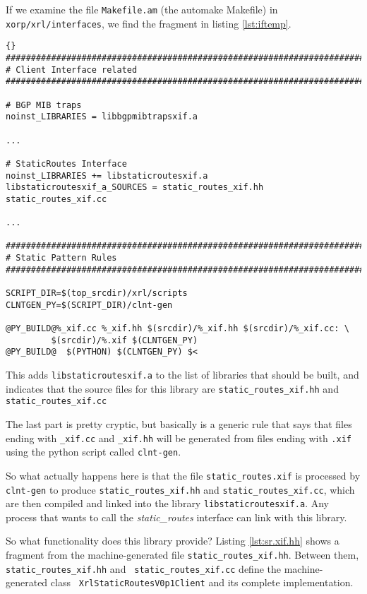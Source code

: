 \documentclass[11pt]{article}
\newcommand{\stt}{\tt\small}
\newcommand{\SRI}{{\it static\_routes}\xspace}
\begin{document}
If we examine the file {\stt Makefile.am} (the automake Makefile) in
{\stt xorp/xrl/interfaces}, we find the fragment in listing
\ref{lst:iftemp}.
\begin{lstlisting}[caption={ Fragment from xorp/xrl/interfaces/Makefile.am %
                                     \label{lst:iftemp} } ]{}
###############################################################################
# Client Interface related
###############################################################################

# BGP MIB traps
noinst_LIBRARIES = libbgpmibtrapsxif.a

...

# StaticRoutes Interface
noinst_LIBRARIES += libstaticroutesxif.a
libstaticroutesxif_a_SOURCES = static_routes_xif.hh static_routes_xif.cc

...

###############################################################################
# Static Pattern Rules
###############################################################################

SCRIPT_DIR=$(top_srcdir)/xrl/scripts
CLNTGEN_PY=$(SCRIPT_DIR)/clnt-gen

@PY_BUILD@%_xif.cc %_xif.hh $(srcdir)/%_xif.hh $(srcdir)/%_xif.cc: \
         $(srcdir)/%.xif $(CLNTGEN_PY)
@PY_BUILD@	$(PYTHON) $(CLNTGEN_PY) $<

\end{lstlisting}%

This adds {\stt libstaticroutesxif.a} to the list of libraries that
should be built, and indicates that the source files for this library
are {\stt static\_routes\_xif.hh} and {\stt static\_routes\_xif.cc}

The last part is pretty cryptic, but basically is a generic rule that
says that files ending with {\stt \_xif.cc} and {\stt \_xif.hh} will be
generated from files ending with {\stt .xif} using the python script
called {\stt clnt-gen}.

So what actually happens here is that the file {\stt static\_routes.xif}
is processed by {\stt clnt-gen} to produce {\stt static\_routes\_xif.hh}
and {\stt static\_routes\_xif.cc}, which are then compiled and linked
into the library {\stt libstaticroutesxif.a}.  Any process that wants
to call the \SRI interface can link with this library.

So what functionality does this library provide?  Listing
\ref{lst:sr.xif.hh} shows a fragment from the machine-generated file
{\stt static\_routes\_xif.hh}.  Between them, {\stt static\_routes\_xif.hh} and {\stt
static\_routes\_xif.cc} define the machine-generated class {\stt
XrlStaticRoutesV0p1Client} and its complete implementation.
\end{document}
